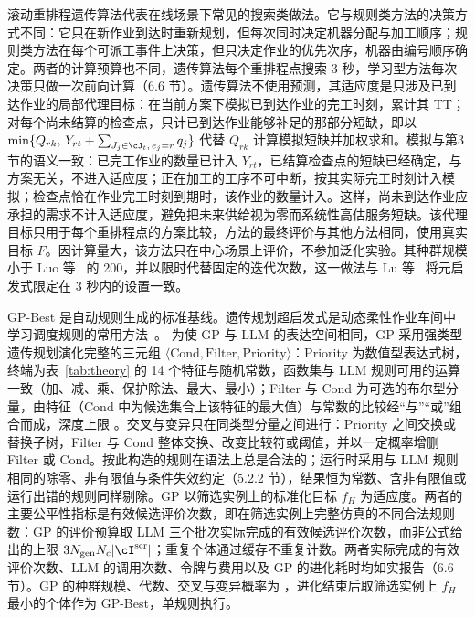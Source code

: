 滚动重排程遗传算法代表在线场景下常见的搜索类做法。它与规则类方法的决策方式不同：它只在新作业到达时重新规划，但每次同时决定机器分配与加工顺序；规则类方法在每个可派工事件上决策，但只决定作业的优先次序，机器由编号顺序确定。两者的计算预算也不同，遗传算法每个重排程点搜索 3 秒，学习型方法每次决策只做一次前向计算（6.6 节）。遗传算法不使用预测，其适应度是只涉及已到达作业的局部代理目标：在当前方案下模拟已到达作业的完工时刻，累计其 TT；对每个尚未结算的检查点，只计已到达作业能够补足的那部分短缺，即以 $\min\{Q_{rk},\,Y_{rt}+\sum_{J_j\in\cJ_t,\,e_j=r}q_j\}$ 代替 $Q_{rk}$ 计算模拟短缺并加权求和。模拟与第3节的语义一致：已完工作业的数量已计入 $Y_{rt}$，已结算检查点的短缺已经确定，与方案无关，不进入适应度；正在加工的工序不可中断，按其实际完工时刻计入模拟；检查点恰在作业完工时刻到期时，该作业的数量计入。这样，尚未到达作业应承担的需求不计入适应度，避免把未来供给视为零而系统性高估服务短缺。该代理目标只用于每个重排程点的方案比较，方法的最终评价与其他方法相同，使用真实目标 $F$。因计算量大，该方法只在中心场景上评价，不参加泛化实验。其种群规模小于 Luo 等~\cite{luo2022} 的 200，并以限时代替固定的迭代次数，这一做法与 Lu 等~\cite{lu2024} 将元启发式限定在 3 秒内的设置一致。%

GP-Best 是自动规则生成的标准基线。遗传规划超启发式是动态柔性作业车间中学习调度规则的常用方法~\cite{xu2022gp,xu2024gp,xu2026gp}。
为使 GP 与 LLM 的表达空间相同，GP 采用强类型遗传规划演化完整的三元组 $\langle\mathrm{Cond},\mathrm{Filter},\mathrm{Priority}\rangle$：Priority 为数值型表达式树，终端为表~\ref{tab:theory} 的 14 个特征与随机常数，函数集与 LLM 规则可用的运算一致（加、减、乘、保护除法、最大、最小）；Filter 与 Cond 为可选的布尔型分量，由特征（Cond 中为候选集合上该特征的最大值）与常数的比较经``与''``或''组合而成，深度上限 \tbd[※]。交叉与变异只在同类型分量之间进行：Priority 之间交换或替换子树，Filter 与 Cond 整体交换、改变比较符或阈值，并以一定概率增删 Filter 或 Cond。按此构造的规则在语法上总是合法的；运行时采用与 LLM 规则相同的除零、非有限值与条件失效约定（5.2.2 节），结果恒为常数、含非有限值或运行出错的规则同样剔除。GP 以筛选实例上的标准化目标 $f_H$ 为适应度。两者的主要公平性指标是有效候选评价次数，即在筛选实例上完整仿真的不同合法规则数：GP 的评价预算取 LLM 三个批次实际完成的有效候选评价次数，而非公式给出的上限 $3N_{\mathrm{gen}}N_c|\cI^{\mathrm{scr}}|$；重复个体通过缓存不重复计数。两者实际完成的有效评价次数、LLM 的调用次数、令牌与费用以及 GP 的进化耗时均如实报告（6.6 节）。GP 的种群规模、代数、交叉与变异概率为 \tbd[※]，进化结束后取筛选实例上 $f_H$ 最小的个体作为 GP-Best，单规则执行。

